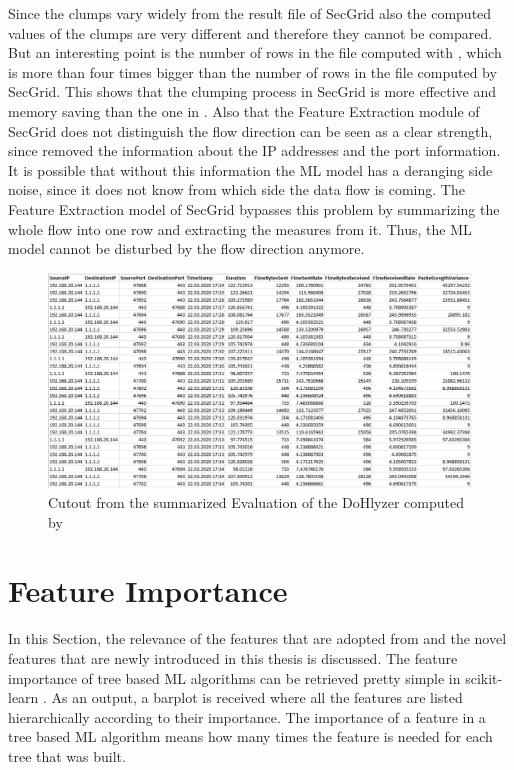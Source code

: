 Since the clumps vary widely from the result file of SecGrid also the computed values of the clumps are very different and therefore they cannot be compared. But an interesting point is the number of rows in the file computed with \cite{DoHlyzer}, which is more than four times bigger than the number of rows in the file computed by SecGrid. This shows that the clumping process in SecGrid is more effective and memory saving than the one in \cite{DoHlyzer}. Also that the Feature Extraction module of SecGrid does not distinguish the flow direction can be seen as a clear strength, since \cite{BehnkeEtAl_FeatureEngineeringMLModelMaliciusDoHTraffic} removed the information about the IP addresses and the port information. It is possible that without this information the ML model has a deranging side noise, since it does not know from which side the data flow is coming. The Feature Extraction model of SecGrid bypasses this problem by summarizing the whole flow into one row and extracting the measures from it. Thus, the ML model cannot be disturbed by the flow direction anymore.

\begin{figure} [h]
\includegraphics[scale=0.5]{images/example_dohlyzer.PNG}
\centering
\caption{Cutout from the summarized Evaluation of the DoHlyzer \cite{DoHlyzer} computed by \cite{montazerishatoori2020anomaly}}
\label{fig:dohlyzer}
\end{figure}

\section{Feature Importance}
In this Section, the relevance of the features that are adopted from \cite{montazerishatoori2020anomaly} and the novel features that are newly introduced in this thesis is discussed. The feature importance of tree based ML algorithms can be retrieved pretty simple in scikit-learn \cite{featureImportance}. As an output, a barplot is received where all the features are listed hierarchically according to their importance. The importance of a feature in a tree based ML algorithm means how many times the feature is needed for each tree that was built.

